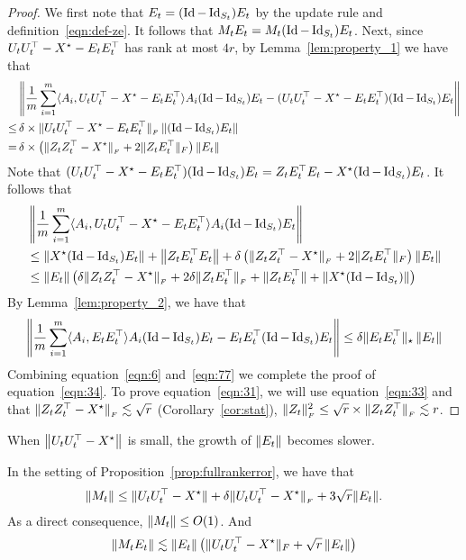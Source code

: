 \begin{proof}
	We first note that $E_t = (\operatorname{Id} - \operatorname{Id}_{S_t})E_t$ by the update rule and definition~\ref{eqn:def-ze}. It follows that $M_tE_t = M_t (\operatorname{Id} - \operatorname{Id}_{S_t})E_t$. 
	Next, since $U_tU_t^\top - {X}^\star-E_tE_t^\top$ has rank at most $4r$, by Lemma~\ref{lem:property_1} we have that 
	\begin{align}
	& \left\|\frac{1}{m}\sum_{i = 1}^m \langle A_i, U_tU_t^\top - {X}^\star-E_tE_t^\top \rangle A_i(\operatorname{Id} - \operatorname{Id}_{S_t})E_t - (U_tU_t^\top - {X}^\star-E_tE_t^\top)(\operatorname{Id} - \operatorname{Id}_{S_t})E_t\right\| \nonumber \\ 
	\le &\, \delta \times \|U_tU_t^\top - {X}^\star-E_tE_t^\top\|_{_{F}} \left\|(\operatorname{Id} - \operatorname{Id}_{S_t})E_t\right\| \label{place_1} \\
	=&\, \delta \times \left(\|Z_tZ_t^\top - {X}^\star\|_{_{F}} + 2\|Z_tE_t^\top\|_F \right)\left\|E_t\right\| \nonumber
	\end{align}
	Note that $(U_tU_t^\top - {X}^\star-E_tE_t^\top)(\operatorname{Id} - \operatorname{Id}_{S_t})E_t = Z_tE_t^\top E_t - {X}^\star(\operatorname{Id} - \operatorname{Id}_{S_t})E_t$. It follows that 
	\begin{align}
	& \left\|\frac{1}{m}\sum_{i = 1}^m \langle A_i, U_tU_t^\top - {X}^\star-E_tE_t^\top \rangle A_i(\operatorname{Id} - \operatorname{Id}_{S_t})E_t\right\| \nonumber \\
	&\le \left\|{X}^\star(\operatorname{Id} - \operatorname{Id}_{S_t})E_t\right\| + \left\|Z_tE_t^\top E_t\right\| + \delta\left(\|Z_tZ_t^\top - {X}^\star\|_{_{F}} + 2\|Z_tE_t^\top\|_F\right)\left\|E_t\right\| \nonumber \\
	& \le \left\|E_t\right\|\left(\delta\|Z_tZ_t^\top - {X}^\star\|_{_{F}} + 2\delta \|Z_tE_t^\top\|_{_{F}} + \|Z_tE_t^{\top}\| + \left\|{X}^\star(\operatorname{Id} - \operatorname{Id}_{S_t})\right\|\right)\label{eqn:77}
	\end{align}
	By Lemma~\ref{lem:property_2}, we have that 
	\begin{align}
	\left\|\frac{1}{m}\sum_{i = 1}^m \langle A_i, E_tE_t^\top \rangle A_i(\operatorname{Id} - \operatorname{Id}_{S_t})E_t - E_tE_t^\top (\operatorname{Id} - \operatorname{Id}_{S_t})E_t\right\| \le \delta \|E_tE_t^\top\|_{\star}\left\|E_t\right\|\label{eqn:6}
	\end{align}
	Combining equation~\eqref{eqn:6} and~\eqref{eqn:77} we complete the proof of equation~\eqref{eqn:34}. To prove equation~\eqref{eqn:31}, we will use equation~\eqref{eqn:33} and that $\|Z_tZ_t^\top - {X}^\star\|_{_{F}}\lesssim \sqrt{r}$ (Corollary~\ref{cor:stat}),
	$\|Z_t\|_{_{F}}^2 \le \sqrt{r} \times \|Z_t Z_t^{\top}\|_{_{F}} \lesssim r$.
\end{proof}

\noindent When $\left\|U_t U_t^{\top} - {X}^\star\right\|$ is small, the growth of $\|E_t\|$ becomes slower.
\begin{lem}\label{lem:norm_M_t_e}\label{lem_Mt}
	In the setting of Proposition~\ref{prop:fullrankerror}, we have that
	\begin{align*}
		\|M_t\| \le \|U_tU_t^{\top} - {X}^\star\| + \delta\|U_tU_t^{\top} - {X}^\star\|_{_{F}} + 3\sqrt{r} \|E_t\|.
	\end{align*}
	As a direct consequence, $\|M_t\| \le O(1)$. And
	\begin{align}
		\left\|M_tE_t\right\| \lesssim \left\|E_t\right\| \left(\|U_tU_t^\top - {X}^\star\|_F + \sqrt{r}\left\|E_t\right\|\right)\label{eqn:345124123}
	\end{align}
\end{lem}

